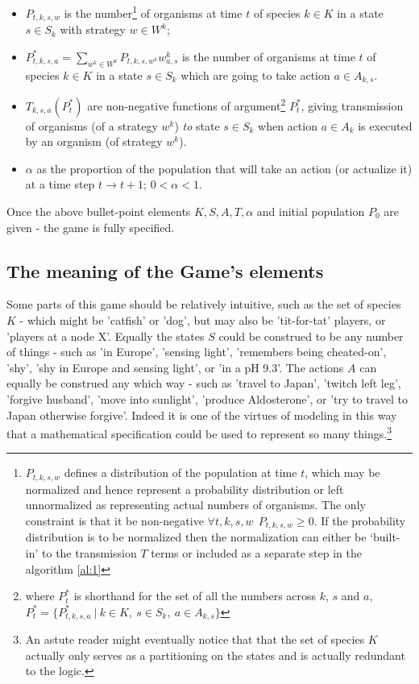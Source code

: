 \begin{itemize}[leftmargin=*,labelsep=4mm]
\item	$P_{t,k,s,w}$ is the number\footnote{$P_{t,k,s,w}$ defines a distribution of the population at time $t$, which may be normalized and hence represent a probability distribution or left unnormalized as representing actual numbers of organisms. The only constraint is that it be non-negative $\forall t,k,s,w~~P_{t,k,s,w}\ge 0$. If the probability distribution is to be normalized then the normalization can either be `built-in' to the transmission $T$ terms or included as a separate step in the algorithm \ref{al:1}} of organisms at time $t$ of species $k\in K$ in a state $s\in S_k$ with strategy $w\in W^k$; 
\item   $P^*_{t,k,s,a} = \sum_{w^k\in W^k}P_{t,k,s,w^k}w^k_{a,s}$ is the number of organisms at time $t$ of species $k\in K$ in a state $s\in S_k$ which are going to take action $a\in A_{k,s}$.
\item   $T_{k,s,a}(P^*_t)$ are non-negative functions of argument\footnote{where $P^*_t$ is shorthand for the set of all the numbers across $k$, $s$ and $a$,  $P^*_t = \{P^*_{t,k,s,a}~|~k\in K,~s\in S_k,~a\in A_{k,s}\}$} $P^*_t$, giving transmission of organisms (of a strategy $w^k$) \textit{to} state $s\in S_k$ when action $a\in A_k$ is executed by an organism (of strategy $w^k$).
\item   $\alpha$ as the proportion of the population that will take an action (or actualize it) at a time step $t\rightarrow t+1$; $0<\alpha<1$.
\end{itemize}

Once the above bullet-point elements $K,S,A,T,\alpha$ and initial population $P_0$ are given - the game is fully specified.
\subsection{The meaning of the Game's elements}

Some parts of this game should be relatively intuitive, such as the set of species $K$ - which might be 'catfish' or 'dog', but may also be 'tit-for-tat' players, or 'players at a node X'.
Equally the states $S$ could be construed to be any number of things - such as 'in Europe', 'sensing light', 'remembers being cheated-on', 'shy', 'shy in Europe and sensing light', or 'in a pH 9.3'.
The actions $A$ can equally be construed any which way - such as 'travel to Japan', 'twitch left leg', 'forgive husband', 'move into sunlight', 'produce Aldosterone', or 'try to travel to Japan otherwise forgive'.
Indeed it is one of the virtues of modeling in this way that a mathematical specification could be used to represent so many things.\footnote{An astute reader might eventually notice that that the set of species $K$ actually only serves as a partitioning on the states and is actually redundant to the logic.}

